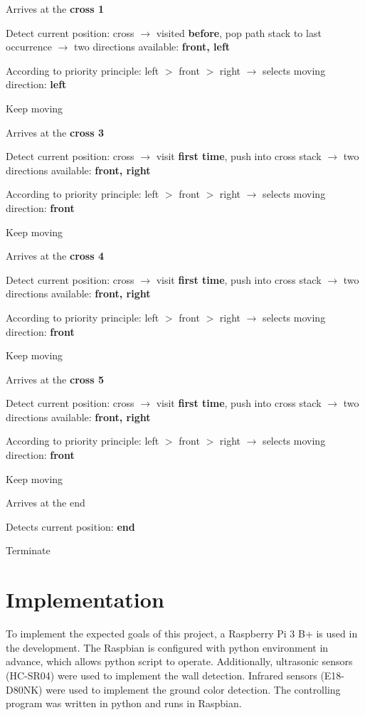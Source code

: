 \documentclass[11pt,times,oneside,openright,hardcopy]{eeereport}
\begin{document}
{    \item Arrives at the \textbf{cross 1}
    \item Detect current position: cross $\rightarrow$ visited \textbf{before}, pop path stack to last occurrence $\rightarrow$ two directions available: \textbf{front, left}
    \item According to priority principle: left $>$ front $>$ right $\rightarrow$ selects moving direction: \textbf{left}
    \item Keep moving
    \item Arrives at the \textbf{cross 3}
    \item Detect current position: cross $\rightarrow$ visit \textbf{first time}, push into cross stack $\rightarrow$ two directions available: \textbf{front, right}
    \item According to priority principle: left $>$ front $>$ right $\rightarrow$ selects moving direction: \textbf{front}
    \item Keep moving
    \item Arrives at the \textbf{cross 4}
    \item Detect current position: cross $\rightarrow$ visit \textbf{first time}, push into cross stack $\rightarrow$ two directions available: \textbf{front, right}
    \item According to priority principle: left $>$ front $>$ right $\rightarrow$ selects moving direction: \textbf{front}
    \item Keep moving
    \item Arrives at the \textbf{cross 5}
    \item Detect current position: cross $\rightarrow$ visit \textbf{first time}, push into cross stack $\rightarrow$ two directions available: \textbf{front, right}
    \item According to priority principle: left $>$ front $>$ right $\rightarrow$ selects moving direction: \textbf{front}
    \item Keep moving
    \item Arrives at the end
    \item Detects current position: \textbf{end}
    \item Terminate
}


\chapter{Implementation}
To implement the expected goals of this project, a Raspberry Pi 3 B+ is used in the development.
The Raspbian is configured with python environment in advance, which allows python script to operate. Additionally, ultrasonic sensors (HC-SR04) were used to implement the wall detection.
Infrared sensors (E18-D80NK) were used to implement the ground color detection. The controlling program was written in python and runs in Raspbian.
\end{document}
